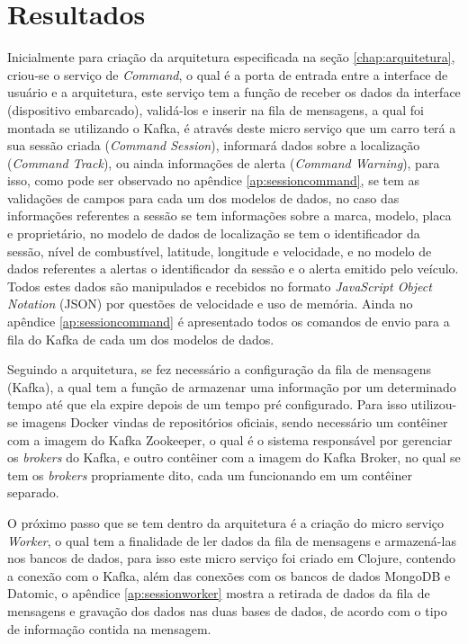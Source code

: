 \chapter{Resultados}
\label{chap:analiseresultados}
Inicialmente para criação da arquitetura especificada na seção \ref{chap:arquitetura}, criou-se o serviço de \textit{Command}, o qual é a porta de entrada entre a interface de usuário e a arquitetura, este serviço tem a função de receber os dados da interface (dispositivo embarcado), validá-los e inserir na fila de mensagens, a qual foi montada se utilizando o Kafka, é através deste micro serviço que um carro terá a sua sessão criada (\textit{Command Session}), informará dados sobre a localização (\textit{Command Track}), ou ainda informações de alerta (\textit{Command Warning}), para isso, como pode ser observado no apêndice \ref{ap:sessioncommand}, se tem as validações de campos para cada um dos modelos de dados, no caso das informações referentes a sessão se tem informações sobre a marca, modelo, placa e  proprietário, no modelo de dados de localização se tem o identificador da sessão, nível de combustível, latitude, longitude e velocidade, e no modelo de dados referentes a alertas o identificador da sessão e o alerta emitido pelo veículo. Todos estes dados são manipulados e recebidos no formato \textit{JavaScript Object Notation} (JSON) por questões de velocidade e uso de memória. Ainda no apêndice  \ref{ap:sessioncommand} é apresentado todos os comandos de envio para a fila do Kafka de cada um dos modelos de dados.

Seguindo a arquitetura, se fez necessário a configuração da fila de mensagens (Kafka), a qual tem a função de armazenar uma informação por um determinado tempo até que ela expire depois de um tempo pré configurado. Para isso utilizou-se imagens Docker vindas de repositórios oficiais, sendo necessário um contêiner com a imagem do Kafka Zookeeper, o qual é o sistema responsável por gerenciar os \textit{brokers} do Kafka, e outro contêiner com a imagem do Kafka Broker, no qual se tem os \textit{brokers} propriamente dito, cada um funcionando em um contêiner separado.

O próximo passo que se tem dentro da arquitetura é a criação do micro serviço \textit{Worker}, o qual tem a finalidade de ler dados da fila de mensagens e armazená-las nos bancos de dados, para isso este micro serviço foi criado em Clojure, contendo a conexão com o Kafka, além das conexões com os bancos de dados MongoDB e Datomic, o apêndice \ref{ap:sessionworker} mostra a retirada de dados da fila de mensagens e gravação dos dados nas duas bases de dados, de acordo com o tipo de informação contida na mensagem.

